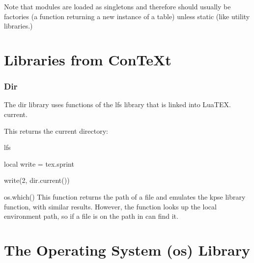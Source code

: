 Note that modules are loaded as singletons and therefore should usually be factories (a function returning a new instance of a table) unless static (like utility libraries.)



\chapter{Libraries from ConTeXt}


\subsection*{Dir}

The dir library uses functions of the lfs library that is linked into LuaTEX.
current.

This returns the current directory:

\begin{texexample}{lfs}{}
\begin{luacode}
local write = tex.sprint

write(2, dir.current())

\end{luacode}
\end{texexample}

{\parskip=1pt
}







\def\function#1{\leavevmode\noindent{\color{teal}
\parindent0pt\leavevmode\par \bfseries #1 }}
 
 
\begin{docLua}{os.which()}  
This function returns the path of a file and emulates the kpse library function, with similar results. However, the function looks up the local environment path, so if a file is on the path in can find it.
\end{docLua}

\chapter{The Operating System (os) Library}

